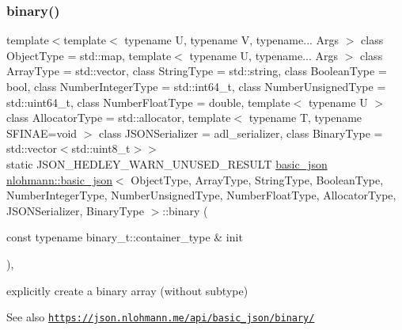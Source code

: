 \subsubsection{\texorpdfstring{binary()}{binary()}\hspace{0.1cm}{\footnotesize\ttfamily [1/4]}}
{\footnotesize\ttfamily template$<$template$<$ typename U, typename V, typename... Args $>$ class Object\+Type = std\+::map, template$<$ typename U, typename... Args $>$ class Array\+Type = std\+::vector, class String\+Type  = std\+::string, class Boolean\+Type  = bool, class Number\+Integer\+Type  = std\+::int64\+\_\+t, class Number\+Unsigned\+Type  = std\+::uint64\+\_\+t, class Number\+Float\+Type  = double, template$<$ typename U $>$ class Allocator\+Type = std\+::allocator, template$<$ typename T, typename S\+F\+I\+N\+A\+E=void $>$ class J\+S\+O\+N\+Serializer = adl\+\_\+serializer, class Binary\+Type  = std\+::vector$<$std\+::uint8\+\_\+t$>$$>$ \\
static J\+S\+O\+N\+\_\+\+H\+E\+D\+L\+E\+Y\+\_\+\+W\+A\+R\+N\+\_\+\+U\+N\+U\+S\+E\+D\+\_\+\+R\+E\+S\+U\+LT \hyperlink{classnlohmann_1_1basic__json}{basic\+\_\+json} \hyperlink{classnlohmann_1_1basic__json}{nlohmann\+::basic\+\_\+json}$<$ Object\+Type, Array\+Type, String\+Type, Boolean\+Type, Number\+Integer\+Type, Number\+Unsigned\+Type, Number\+Float\+Type, Allocator\+Type, J\+S\+O\+N\+Serializer, Binary\+Type $>$\+::binary (\begin{DoxyParamCaption}\item[{const typename binary\+\_\+t\+::container\+\_\+type \&}]{init }\end{DoxyParamCaption})\hspace{0.3cm}{\ttfamily [inline]}, {\ttfamily [static]}}



explicitly create a binary array (without subtype) 

\begin{DoxySeeAlso}{See also}
\href{https://json.nlohmann.me/api/basic_json/binary/}{\tt https\+://json.\+nlohmann.\+me/api/basic\+\_\+json/binary/} 
\end{DoxySeeAlso}
\mbox{\label{classnlohmann_1_1basic__json_a7ad4b5b7c96e77d3e105a71ce2147727}} 
